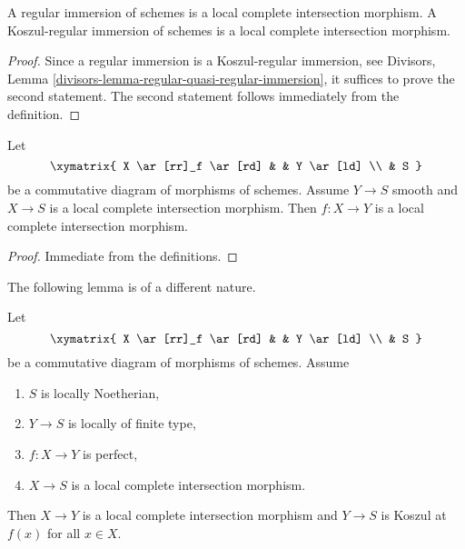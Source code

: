 \begin{lemma}
\label{lemma-regular-immersion-lci}
A regular immersion of schemes is a local complete intersection morphism.
A Koszul-regular immersion of schemes is a local complete intersection
morphism.
\end{lemma}

\begin{proof}
Since a regular immersion is a Koszul-regular immersion, see
Divisors, Lemma \ref{divisors-lemma-regular-quasi-regular-immersion},
it suffices to prove the second statement. The second statement
follows immediately from the definition.
\end{proof}

\begin{lemma}
\label{lemma-lci-permanence}
Let
$$
\xymatrix{
X \ar[rr]_f \ar[rd] & & Y \ar[ld] \\
& S
}
$$
be a commutative diagram of morphisms of schemes. Assume $Y \to S$
smooth and $X \to S$ is a local complete intersection morphism.
Then $f : X \to Y$ is a local complete intersection morphism.
\end{lemma}

\begin{proof}
Immediate from the definitions.
\end{proof}

\noindent
The following lemma is of a different nature.

\begin{lemma}
\label{lemma-lci-avramov}
Let
$$
\xymatrix{
X \ar[rr]_f \ar[rd] & & Y \ar[ld] \\
& S
}
$$
be a commutative diagram of morphisms of schemes. Assume
\begin{enumerate}
\item $S$ is locally Noetherian,
\item $Y \to S$ is locally of finite type,
\item $f : X \to Y$ is perfect,
\item $X \to S$ is a local complete intersection morphism.
\end{enumerate}
Then $X \to Y$ is a local complete intersection morphism
and $Y \to S$ is Koszul at $f(x)$ for all $x \in X$.
\end{lemma}

